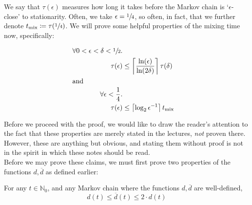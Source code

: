 		We say that $\tau(\epsilon)$ measures how long it takes before the Markov chain 
		is `$\epsilon$-close' to stationarity. Often, we take $\epsilon = \sfrac{1}{4}$,
		so often, in fact, that we further denote $t_\mathrm{mix} \coloneqq \tau(
		\sfrac{1}{4})$. We will prove some helpful properties of the mixing time now,
		specifically:
		\begin{claim}
			\begin{align*}
				\forall 0 < \epsilon < \delta < \sfrac{1}{2} . \\
				\tau(\epsilon) &\leq \left\lceil 
				\frac{\ln(\epsilon)}{\ln(2\delta)} \right\rceil \tau(\delta)\\
				\intertext{and}
				\forall \epsilon < \frac{1}{4} . \\
				\tau(\epsilon) &\leq \left\lceil \log_2 \epsilon^{-1}\right\rceil
				t_\mathrm{mix}
			\end{align*}
		\end{claim}
		Before we proceed with the proof, we would like to draw the reader's attention
		to the fact that these properties are merely stated in the lectures, \emph{not} 
		proven there. However, these are anything but obvious, and stating them without
		proof is not in the spirit in which these notes should be read.
		\\
		Before we may prove these claims, we must first prove two properties of the 
		functions $d, \overline d$ as defined earlier:
		\begin{lemma}
			For any $t \in \mathbb{N}_0$, and any Markov chain where the functions 
			$d, \overline d$ are well-defined,
			$$
				d(t) \leq \overline d(t) \leq 2 \cdot d(t)
			$$
		\end{lemma}
